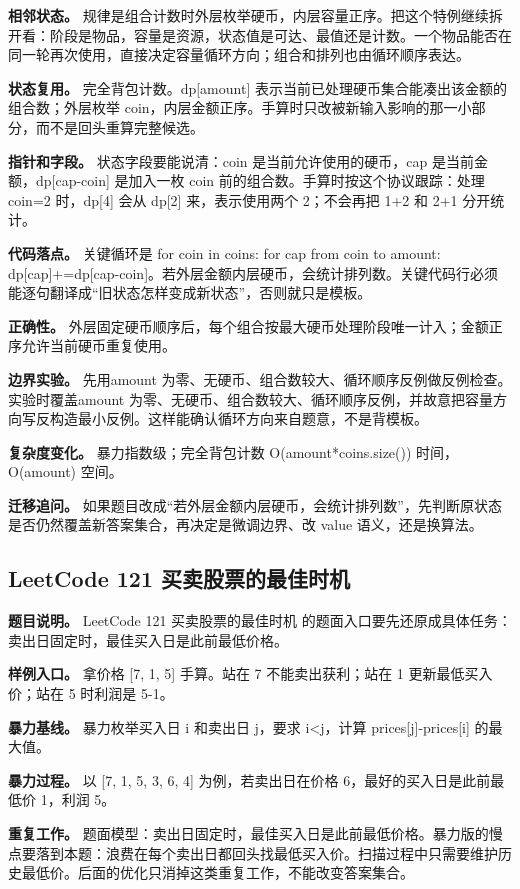\textbf{相邻状态。} 规律是组合计数时外层枚举硬币，内层容量正序。把这个特例继续拆开看：阶段是物品，容量是资源，状态值是可达、最值还是计数。一个物品能否在同一轮再次使用，直接决定容量循环方向；组合和排列也由循环顺序表达。

\textbf{状态复用。} 完全背包计数。dp[amount] 表示当前已处理硬币集合能凑出该金额的组合数；外层枚举 coin，内层金额正序。手算时只改被新输入影响的那一小部分，而不是回头重算完整候选。

\textbf{指针和字段。} 状态字段要能说清：coin 是当前允许使用的硬币，cap 是当前金额，dp[cap-coin] 是加入一枚 coin 前的组合数。手算时按这个协议跟踪：处理 coin=2 时，dp[4] 会从 dp[2] 来，表示使用两个 2；不会再把 1+2 和 2+1 分开统计。

\textbf{代码落点。} 关键循环是 for coin in coins: for cap from coin to amount: dp[cap]+=dp[cap-coin]。若外层金额内层硬币，会统计排列数。关键代码行必须能逐句翻译成“旧状态怎样变成新状态”，否则就只是模板。

\textbf{正确性。} 外层固定硬币顺序后，每个组合按最大硬币处理阶段唯一计入；金额正序允许当前硬币重复使用。

\textbf{边界实验。} 先用amount 为零、无硬币、组合数较大、循环顺序反例做反例检查。实验时覆盖amount 为零、无硬币、组合数较大、循环顺序反例，并故意把容量方向写反构造最小反例。这样能确认循环方向来自题意，不是背模板。

\textbf{复杂度变化。} 暴力指数级；完全背包计数 O(amount*coins.size()) 时间，O(amount) 空间。

\textbf{迁移追问。} 如果题目改成“若外层金额内层硬币，会统计排列数”，先判断原状态是否仍然覆盖新答案集合，再决定是微调边界、改 value 语义，还是换算法。

\subsection{LeetCode 121 买卖股票的最佳时机}

\textbf{题目说明。} LeetCode 121 买卖股票的最佳时机 的题面入口要先还原成具体任务：卖出日固定时，最佳买入日是此前最低价格。

\textbf{样例入口。} 拿价格 [7, 1, 5] 手算。站在 7 不能卖出获利；站在 1 更新最低买入价；站在 5 时利润是 5-1。

\textbf{暴力基线。} 暴力枚举买入日 i 和卖出日 j，要求 i<j，计算 prices[j]-prices[i] 的最大值。

\textbf{暴力过程。} 以 [7, 1, 5, 3, 6, 4] 为例，若卖出日在价格 6，最好的买入日是此前最低价 1，利润 5。

\textbf{重复工作。} 题面模型：卖出日固定时，最佳买入日是此前最低价格。暴力版的慢点要落到本题：浪费在每个卖出日都回头找最低买入价。扫描过程中只需要维护历史最低价。后面的优化只消掉这类重复工作，不能改变答案集合。


